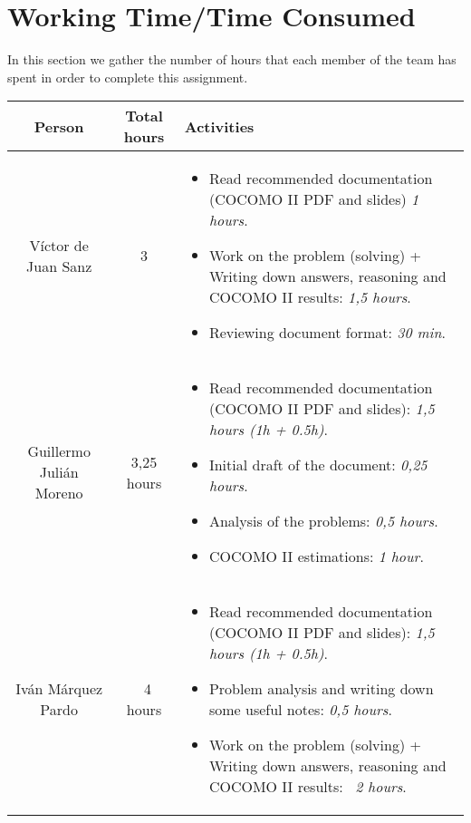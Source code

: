 \section{Working Time/Time Consumed}
In this section we gather the number of hours that each member of the team has spent in order to complete this assignment.

\begin{table}[htbp]
\centering
\begin{tabular}{|c|c|m{10cm}|} \hline
\textbf{Person} & \textbf{Total hours} & \textbf{Activities} \\ \hline
V\'ictor de Juan Sanz & 3 & \begin{itemize}[leftmargin=15pt, rightmargin=15pt]
\item Read recommended documentation (COCOMO II PDF and slides) \emph{1 hours}.
\item Work on the problem (solving) + Writing down answers, reasoning and COCOMO II results: \emph{1,5 hours}.
\item Reviewing document format: \emph{30 min}.
\end{itemize} \\ \hline
Guillermo Juli\'an Moreno & 3,25 hours & \begin{itemize}[leftmargin=15pt, rightmargin=15pt]
\item Read recommended documentation (COCOMO II PDF and slides): \emph{1,5 hours (1h + 0.5h)}.
\item Initial draft of the document: \emph{0,25 hours}.
\item Analysis of the problems: \emph{0,5 hours}.
\item COCOMO II estimations: \emph{1 hour}.
\end{itemize} \\ \hline
Iv\'an M\'arquez Pardo & ~4 hours &
\begin{itemize}[leftmargin=15pt, rightmargin=15pt]
\item Read recommended documentation (COCOMO II PDF and slides): \emph{1,5 hours (1h + 0.5h)}.
\item Problem analysis and writing down some useful notes: \emph{0,5 hours}.
\item Work on the problem (solving) + Writing down answers, reasoning and COCOMO II results: \emph{~2 hours}.
\end{itemize} \\ \hline
\end{tabular}
\end{table}

